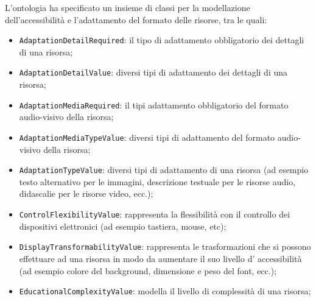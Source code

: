 L'ontologia ha specificato un insieme di classi per la modellazione dell'accessibilità e l'adattamento del formato delle risorse, tra le quali:
\begin{itemize}
    \item \texttt{AdaptationDetailRequired}: il tipo di adattamento obbligatorio dei dettagli di una risorsa;
    \item \texttt{AdaptationDetailValue}: diversi tipi di adattamento dei dettagli di una risorsa;
    \item \texttt{AdaptationMediaRequired}: il tipi adattamento obbligatorio del formato audio-visivo della risorsa;
    \item \texttt{AdaptationMediaTypeValue}: diversi tipi di adattamento del formato audio-visivo della risorsa;
    \item \texttt{AdaptationTypeValue}: diversi tipi di adattamento di una risorsa (ad esempio testo alternativo per le immagini, descrizione testuale per le risorse audio, didascalie per le risorse video, ecc.);
    \item \texttt{ControlFlexibilityValue}: rappresenta la flessibilità con il controllo dei dispositivi elettronici (ad esempio tastiera, mouse, etc);
    \item \texttt{DisplayTransformabilityValue}: rappresenta le trasformazioni che si possono effettuare ad una risorsa in modo da aumentare il suo livello d' accessibilità (ad esempio colore del background, dimensione e peso del font, ecc.);
    \item \texttt{EducationalComplexityValue}: modella il livello di complessità di una risorsa;
\end{itemize}
